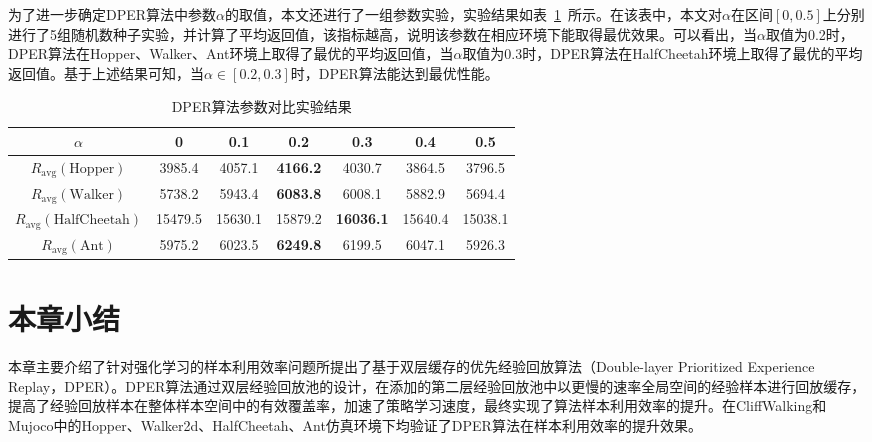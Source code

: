 为了进一步确定DPER算法中参数$\alpha$的取值，本文还进行了一组参数实验，实验结果如表~\ref{tab:dper-ablation}~所示。在该表中，本文对$\alpha$在区间$[0,0.5]$上分别进行了5组随机数种子实验，并计算了平均返回值，该指标越高，说明该参数在相应环境下能取得最优效果。可以看出，当$\alpha$取值为0.2时，DPER算法在Hopper、Walker、Ant环境上取得了最优的平均返回值，当$\alpha$取值为0.3时，DPER算法在HalfCheetah环境上取得了最优的平均返回值。基于上述结果可知，当$\alpha\in[0.2,0.3]$时，DPER算法能达到最优性能。

\begin{table}[ht]
\centering
\caption{DPER算法参数对比实验结果}
\begin{tabular}{ccccccc} 
\toprule
$\alpha$                           & \textbf{0}       & \textbf{0.1}     & \textbf{0.2}             & \textbf{0.3}              & \textbf{0.4}     & \textbf{0.5}      \\ 
\midrule
$R_\text{avg}(\text{Hopper})$      & 3985.4  & 4057.1  & \textbf{4166.2} & 4030.7           & 3864.5  & 3796.5   \\ 
$R_\text{avg}(\text{Walker})$      & 5738.2  & 5943.4  & \textbf{6083.8} & 6008.1           & 5882.9  & 5694.4   \\ 
$R_\text{avg}(\text{HalfCheetah})$ & 15479.5 & 15630.1 & 15879.2         & \textbf{16036.1} & 15640.4 & 15038.1  \\ 
$R_\text{avg}(\text{Ant})$         & 5975.2  & 6023.5  & \textbf{6249.8} & 6199.5           & 6047.1  & 5926.3   \\
\bottomrule
\end{tabular}


\label{tab:dper-ablation}
\end{table}

\section{本章小结}

本章主要介绍了针对强化学习的样本利用效率问题所提出了基于双层缓存的优先经验回放算法（Double-layer Prioritized Experience Replay，DPER）。DPER算法通过双层经验回放池的设计，在添加的第二层经验回放池中以更慢的速率全局空间的经验样本进行回放缓存，提高了经验回放样本在整体样本空间中的有效覆盖率，加速了策略学习速度，最终实现了算法样本利用效率的提升。在CliffWalking和Mujoco中的Hopper、Walker2d、HalfCheetah、Ant仿真环境下均验证了DPER算法在样本利用效率的提升效果。